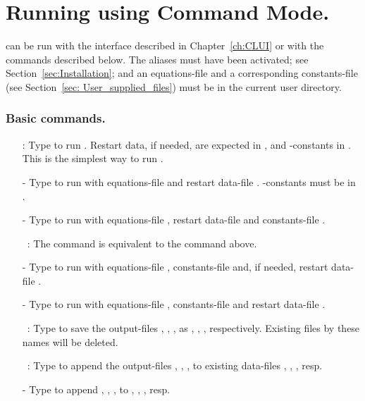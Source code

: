 \chapter{ Running \AUTO using Command Mode.} \label{sec:command_mode}
\AUTO can be run with the interface described in Chapter~\ref{ch:CLUI} 
or with the commands described below.
The \AUTO aliases must have been activated; see Section~\ref{sec:Installation}; 
and an equations-file  
and a corresponding constants-file  
(see Section~\ref{sec: User_supplied_files})
must be in the current user directory.
\\

\subsection{ Basic commands.} 

\begin{itemize}
\item[\commandf{@r}]:
  Type  to run \AUTO.
  Restart data, if needed, are expected in ,
  and \AUTO-constants in .
  This is the simplest way to run \AUTO.
\item[-]
  Type  to run \AUTO
  with equations-file  and restart data-file .
  \AUTO-constants must be in .
\item[-]
  Type  to run \AUTO
  with equations-file , restart data-file 
  and constants-file .

\item[\commandf{@R}]~:
  The command  is equivalent to the command  above.
\item[-]
  Type   to run \AUTO with equations-file ,
  constants-file 
  and, if needed, restart data-file . 
\item[-]
  Type  to run \AUTO
  with equations-file , 
  constants-file 
  and restart data-file .

\item[\commandf{@sv}]~:
  Type  to save the output-files 
  , , ,
  as , , , respectively.
  Existing files by these names will be deleted.

\item[\commandf{@ap}]~:
  Type  to append the output-files 
  , , , 
  to existing data-files 
  , , , resp.
\item[-]
  Type  
  to append 
  , , , to
  , , , resp.
\end{itemize}

